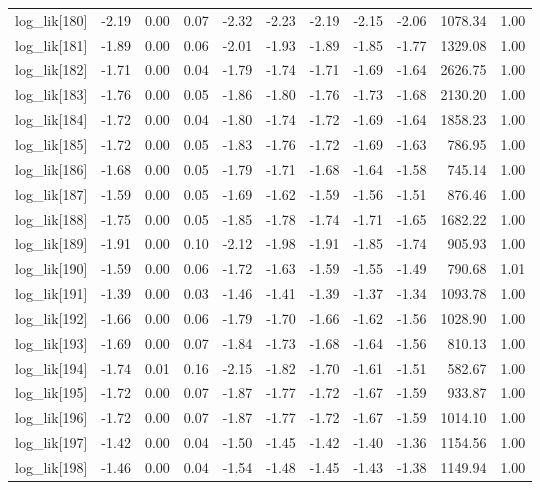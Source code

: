 \begin{table}[ht]
\begin{tabular}{rrrrrrrrrrr}
  log\_lik[180] & -2.19 & 0.00 & 0.07 & -2.32 & -2.23 & -2.19 & -2.15 & -2.06 & 1078.34 & 1.00 \\ 
  log\_lik[181] & -1.89 & 0.00 & 0.06 & -2.01 & -1.93 & -1.89 & -1.85 & -1.77 & 1329.08 & 1.00 \\ 
  log\_lik[182] & -1.71 & 0.00 & 0.04 & -1.79 & -1.74 & -1.71 & -1.69 & -1.64 & 2626.75 & 1.00 \\ 
  log\_lik[183] & -1.76 & 0.00 & 0.05 & -1.86 & -1.80 & -1.76 & -1.73 & -1.68 & 2130.20 & 1.00 \\ 
  log\_lik[184] & -1.72 & 0.00 & 0.04 & -1.80 & -1.74 & -1.72 & -1.69 & -1.64 & 1858.23 & 1.00 \\ 
  log\_lik[185] & -1.72 & 0.00 & 0.05 & -1.83 & -1.76 & -1.72 & -1.69 & -1.63 & 786.95 & 1.00 \\ 
  log\_lik[186] & -1.68 & 0.00 & 0.05 & -1.79 & -1.71 & -1.68 & -1.64 & -1.58 & 745.14 & 1.00 \\ 
  log\_lik[187] & -1.59 & 0.00 & 0.05 & -1.69 & -1.62 & -1.59 & -1.56 & -1.51 & 876.46 & 1.00 \\ 
  log\_lik[188] & -1.75 & 0.00 & 0.05 & -1.85 & -1.78 & -1.74 & -1.71 & -1.65 & 1682.22 & 1.00 \\ 
  log\_lik[189] & -1.91 & 0.00 & 0.10 & -2.12 & -1.98 & -1.91 & -1.85 & -1.74 & 905.93 & 1.00 \\ 
  log\_lik[190] & -1.59 & 0.00 & 0.06 & -1.72 & -1.63 & -1.59 & -1.55 & -1.49 & 790.68 & 1.01 \\ 
  log\_lik[191] & -1.39 & 0.00 & 0.03 & -1.46 & -1.41 & -1.39 & -1.37 & -1.34 & 1093.78 & 1.00 \\ 
  log\_lik[192] & -1.66 & 0.00 & 0.06 & -1.79 & -1.70 & -1.66 & -1.62 & -1.56 & 1028.90 & 1.00 \\ 
  log\_lik[193] & -1.69 & 0.00 & 0.07 & -1.84 & -1.73 & -1.68 & -1.64 & -1.56 & 810.13 & 1.00 \\ 
  log\_lik[194] & -1.74 & 0.01 & 0.16 & -2.15 & -1.82 & -1.70 & -1.61 & -1.51 & 582.67 & 1.00 \\ 
  log\_lik[195] & -1.72 & 0.00 & 0.07 & -1.87 & -1.77 & -1.72 & -1.67 & -1.59 & 933.87 & 1.00 \\ 
  log\_lik[196] & -1.72 & 0.00 & 0.07 & -1.87 & -1.77 & -1.72 & -1.67 & -1.59 & 1014.10 & 1.00 \\ 
  log\_lik[197] & -1.42 & 0.00 & 0.04 & -1.50 & -1.45 & -1.42 & -1.40 & -1.36 & 1154.56 & 1.00 \\ 
  log\_lik[198] & -1.46 & 0.00 & 0.04 & -1.54 & -1.48 & -1.45 & -1.43 & -1.38 & 1149.94 & 1.00 \\ 

\end{tabular}
\end{table}
